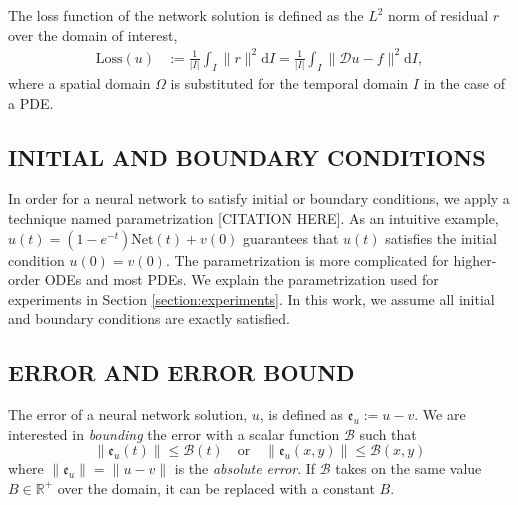 \documentclass[accepted]{uai2023}
\newcommand{\Err}{\mathfrak{e}}
\newcommand{\Bound}{\mathcal{B}}
\newcommand{\Loss}{\mathrm{Loss}}
\newcommand{\Net}{\mathrm{Net}}
\begin{document}
    The loss function of the network solution is defined as the $L^2$ norm of residual $r$ over the domain of interest,
    {
        \small
        \begin{align}
            \Loss{}(u) &:= \frac{1}{|I|} \int_{I} \|r\|^2 \mathrm{d}I = \frac{1}{|I|} \int_{I} \|\mathcal{D} u - f\|^2 \mathrm{d}I,
        \end{align}
    }
    where a spatial domain $\Omega$ is substituted for the temporal domain $I$ in the case of a PDE.

\subsection{INITIAL AND BOUNDARY CONDITIONS}\label{section:initial-and-boundary-conditions}
    In order for a neural network to satisfy initial or boundary conditions, we apply a technique named parametrization [CITATION HERE]. 
    As an intuitive example, $u(t) = (1 - e^{-t}) \Net(t) + v(0)$ guarantees that $u(t)$ satisfies the initial condition $u(0)=v(0)$. 
    The parametrization is more complicated for higher-order ODEs and most PDEs. 
    We explain the parametrization used for experiments in Section \ref{section:experiments}. 
    In this work, we assume all initial and boundary conditions are exactly satisfied.

\subsection{ERROR AND ERROR BOUND}
    The error of a neural network solution, $u$, is defined as $ \Err_u := u - v$.
    We are interested in \textit{bounding} the error with a scalar function $\Bound$ such that
    {
        \small
        \begin{equation}
            \|\Err_u(t)\| \leq \Bound(t) \quad\text{or}\quad \|\Err_{u}(x, y)\| \leq \Bound(x, y)
        \end{equation}
    }
    where $\|\Err_u\| = \|u - v\|$ is the \textit{absolute error}.
    If $\Bound$ takes on the same value $B \in \mathbb{R}^{+}$ over the domain, it can be replaced with a constant $B$.
\end{document}
